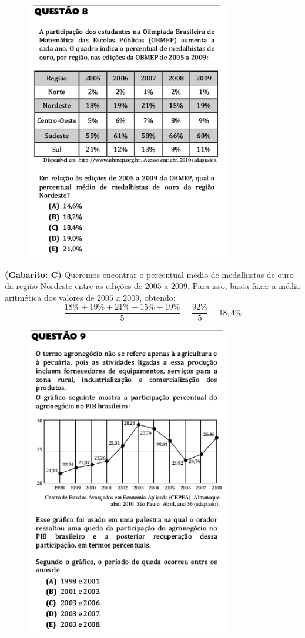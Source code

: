 \documentclass[a4paper]{article}
\begin{document}
\begin{figure}[H]
	\begin{center}
		\includegraphics[width=9cm]{L1Q8.png}
	\end{center}
\end{figure}
\par\textbf{(Gabarito: C)} Queremos encontrar o percentual médio de medalhistas de ouro da região Nordeste entre as edições de $2005$ a $2009$. Para isso, basta fazer a média aritmética dos valores de $2005$ a $2009$, obtendo:
\begin{equation*}
\frac{18\%+19\%+21\%+15\%+19\%}{5} = \frac{92\%}{5} = 18,4\%
\end{equation*}
\begin{figure}[H]
	\begin{center}
		\includegraphics[width=9cm]{L1Q9.png}
	\end{center}
\end{figure}
\end{document}
